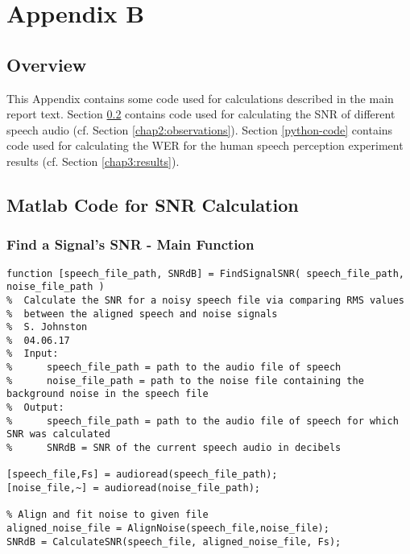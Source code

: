 % 
% 
% 

\chapter*{Appendix B}\label{appendixB}


\section{Overview}

This Appendix contains some code used for calculations described in the main report text.  Section \ref{matlab-code} contains code used for calculating the SNR of different speech audio (cf. Section \ref{chap2:observations}).  Section \ref{python-code} contains code used for calculating the WER for the human speech perception experiment results (cf. Section \ref{chap3:results}).

\section{Matlab Code for SNR Calculation}\label{matlab-code}

\subsection{Find a Signal's SNR - Main Function}

\begin{verbatim}
function [speech_file_path, SNRdB] = FindSignalSNR( speech_file_path, noise_file_path )
%  Calculate the SNR for a noisy speech file via comparing RMS values
%  between the aligned speech and noise signals
%  S. Johnston
%  04.06.17
%  Input:
%      speech_file_path = path to the audio file of speech
%      noise_file_path = path to the noise file containing the background noise in the speech file
%  Output:
%      speech_file_path = path to the audio file of speech for which SNR was calculated
%      SNRdB = SNR of the current speech audio in decibels

[speech_file,Fs] = audioread(speech_file_path);
[noise_file,~] = audioread(noise_file_path);

% Align and fit noise to given file
aligned_noise_file = AlignNoise(speech_file,noise_file);
SNRdB = CalculateSNR(speech_file, aligned_noise_file, Fs);
\end{verbatim}


